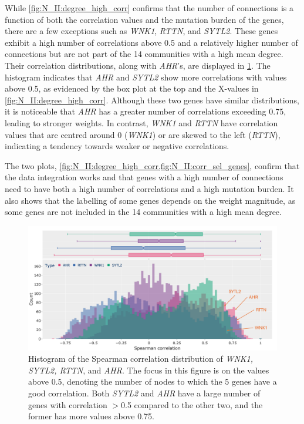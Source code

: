 While \cref{fig:N_II:degree_high_corr} confirms that the number of connections is a function of both the correlation values and the mutation burden of the genes, there are a few exceptions such as \textit{WNK1}, \textit{RTTN}, and \textit{SYTL2}. These genes exhibit a high number of correlations above 0.5 and a relatively higher number of connections but are not part of the 14 communities with a high mean degree. Their correlation distributions, along with \textit{AHR}'s, are displayed in \cref{fig:N_II:corr_sel_genes}. The histogram indicates that \textit{AHR} and \textit{SYTL2} show more correlations with values above 0.5, as evidenced by the box plot at the top and the X-values in \cref{fig:N_II:degree_high_corr}. Although these two genes have similar distributions, it is noticeable that \textit{AHR} has a greater number of correlations exceeding 0.75, leading to stronger weights. In contrast, \textit{WNK1} and \textit{RTTN} have correlation values that are centred around 0 (\textit{WNK1}) or are skewed to the left (\textit{RTTN}), indicating a tendency towards weaker or negative correlations.

The two plots, \cref{fig:N_II:degree_high_corr,fig:N_II:corr_sel_genes}, confirm that the data integration works and that genes with a high number of connections need to have both a high number of correlations and a high mutation burden. It also shows that the labelling of some genes depends on the weight magnitude, as some genes are not included in the 14 communities with a high mean degree.


\begin{figure}[!htb]    
    \centering
    \includegraphics[width=1.0\textwidth,height=1.0\textheight,keepaspectratio]{Sections/Network_II/resources/reward/hist_corr_labels.png}
    \caption{Histogram of the Spearman correlation distribution of \textit{WNK1, SYTL2, RTTN}, and \textit{AHR}. The focus in this figure is on the values above 0.5, denoting the number of nodes to which the 5 genes have a good correlation. Both \textit{SYTL2} and \textit{AHR} have a large number of genes with correlation $>$0.5 compared to the other two, and the former has more values above 0.75. }
    \label{fig:N_II:corr_sel_genes}
\end{figure}


